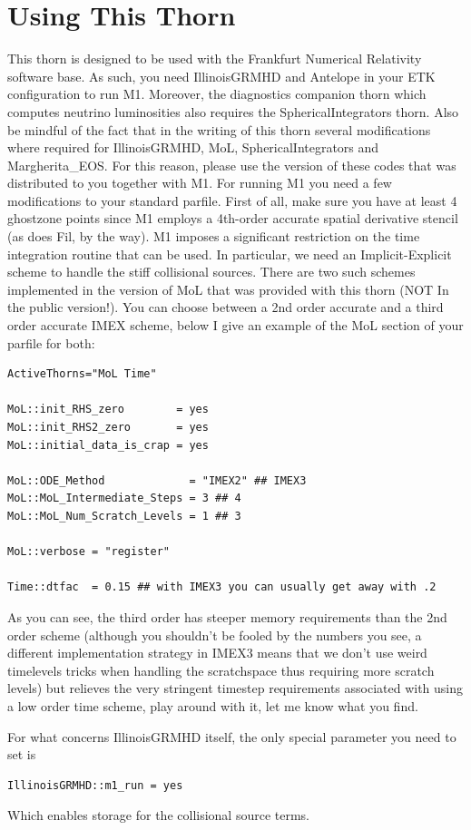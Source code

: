 \section{Using This Thorn}

This thorn is designed to be used with the Frankfurt Numerical Relativity software base. As such, you need IllinoisGRMHD and Antelope in your ETK configuration  to run M1. Moreover, the diagnostics companion thorn which computes neutrino luminosities also requires the SphericalIntegrators thorn. Also be mindful of the fact that in the writing of this thorn several modifications where required for IllinoisGRMHD, MoL, SphericalIntegrators and Margherita_EOS. For this  reason, please use the version of these codes that was distributed to you together with M1.
For running M1 you need a few modifications to your standard parfile. First of all, make sure you have at least 4 ghostzone points since M1 employs a 4th-order accurate spatial derivative stencil (as does Fil, by the way).
M1 imposes a significant restriction on the time integration routine that can be used. In particular, we need an Implicit-Explicit scheme to handle the stiff collisional sources. There are two such schemes implemented in the version of MoL that was provided with this thorn (NOT In the public version!).
You can choose between a 2nd order accurate and a third order accurate IMEX scheme, below I give an example of the MoL section of your parfile for both:
\begin{verbatim}
ActiveThorns="MoL Time"

MoL::init_RHS_zero        = yes
MoL::init_RHS2_zero       = yes
MoL::initial_data_is_crap = yes

MoL::ODE_Method             = "IMEX2" ## IMEX3
MoL::MoL_Intermediate_Steps = 3 ## 4
MoL::MoL_Num_Scratch_Levels = 1 ## 3

MoL::verbose = "register"

Time::dtfac  = 0.15 ## with IMEX3 you can usually get away with .2
\end{verbatim}
As you can see, the third order has steeper memory requirements than the 2nd order scheme (although you shouldn't be fooled by the numbers you see, a different implementation strategy in IMEX3 means that we don't use weird timelevels tricks when handling the scratchspace thus requiring more scratch levels) but relieves the very stringent timestep requirements associated with using a low order time scheme, play around with it, let me know what you find.

For what concerns IllinoisGRMHD itself, the only special parameter you need to set is
\begin{verbatim}
IllinoisGRMHD::m1_run = yes
\end{verbatim}
Which enables storage for the collisional source terms.

